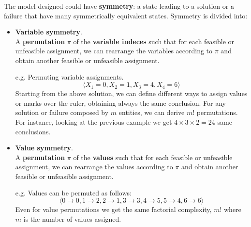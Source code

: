 The model designed could have \textbf{symmetry}: a state leading to a solution or a failure that have many symmetrically equivalent states. Symmetry 
is divided into:
\begin{itemize}
    \renewcommand{\labelitemi}{-}
    \item \textbf{Variable symmetry}. \\ A \textbf{permutation} $\pi$ of the \textbf{variable indeces} such that for each feasible or unfeasible assignment, we can rearrange the variables according to $\pi$ and obtain another feasible or unfeasible assignment.
    \begin{example}[title = Variable symmetry in Golomb ruler problem]
        e.g. Permuting variable assignments. 
        $$ \langle X_1 = 0, X_2 = 1, X_3 = 4, X_4 = 6 \rangle $$
        Starting from the above solution, we can define different ways to assign values or marks over the ruler, obtaining always the same conclusion. For any 
        solution or failure composed by $m$ entities, we can derive $m!$ permutations. For instance, looking at the previous example we get $4 \times 3 \times 2 = 24$ same conclusions.
    \end{example}
    \item \textbf{Value symmetry}. \\ A \textbf{permutation} $\pi$ of the \textbf{values} such that for each feasible or unfeasible assignment, we can rearrange the values according to $\pi$ and obtain another feasible or unfeasible assignment.
    \begin{example}[title = Value symmetry in Golomb ruler problem]
        e.g. Values can be permuted as follows:
        $$ \langle 0 \rightarrow 0, 1 \rightarrow 2, 2 \rightarrow 1, 3 \rightarrow 3, 4 \rightarrow 5, 5 \rightarrow 4, 6 \rightarrow 6 \rangle $$
        Even for value permutations we get the same factorial complexity, $m!$ where $m$ is the number of values assigned.
    \end{example}
\end{itemize}